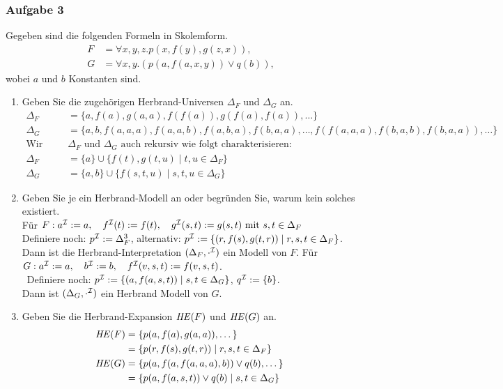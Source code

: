 \subsubsection*{Aufgabe 3}
Gegeben sind die folgenden Formeln in Skolemform. 
\begin{align*}
F &= \forall x,y,z.p(x,f(y),g(z,x)), \\
G &= \forall x,y.(p(a,f(a,x,y)) \lor q(b)),
\end{align*}
wobei $a$ und $b$ Konstanten sind.
\begin{enumerate}
\item Geben Sie die zugehörigen Herbrand-Universen $\Delta_F$ und $\Delta_G$ an. \\
\LOES 
\begin{align*}
\Delta_F &= \{a, f(a), g(a,a), f(f(a)), g(f(a),f(a)), \dots \} \\
\Delta_G &= \{a, b, f(a,a,a), f(a,a,b), f(a,b,a), f(b,a,a), \dots, f(f(a,a,a),f(b,a,b),f(b,a,a)), \dots \} \\
\text{Wir können } &\Delta_F \text{ und } \Delta_G \text{ auch rekursiv wie folgt charakterisieren:} \\
\Delta_F &= \{a\} \cup \{f(t),g(t,u) \mid t,u \in \Delta_F \} \\
\Delta_G &= \{a,b\} \cup \{f(s,t,u) \mid s,t,u \in \Delta_G\}
\end{align*}
\item Geben Sie je ein Herbrand-Modell an oder begründen Sie, warum kein solches existiert. \\
\LOES Für $F: a^{\mathcal{I}} := a,\quad f^{\mathcal{I}}(t) := f(t),\quad g^{\mathcal{I}}(s,t) := g(s,t) \text{ mit } s,t \in \Delta_F$ \\
Definiere noch: $p^{\mathcal{I}} := \Delta_F^3$, alternativ: $p^{\mathcal{I}} := \{(r,f(s),g(t,r)) \mid r,s,t \in \Delta_F \}$. \\
Dann ist die Herbrand-Interpretation $(\Delta_F, \cdot^{\mathcal{I}})$ ein Modell von $F$.
\HRule{3cm}{3mm}
Für $G: a^{\mathcal{I}} := a,\quad b^{\mathcal{I}} := b,\quad f^{\mathcal{I}}(v,s,t) := f(v,s,t)$. \\\
Definiere noch: $p^{\mathcal{I}} := \{(a,f(a,s,t)) \mid s,t \in \Delta_G \}$, $q^{\mathcal{I}} := \{b\}$. \\
Dann ist $(\Delta_G, \cdot^{\mathcal{I}})$ ein Herbrand Modell von $G$.
\item Geben Sie die Herbrand-Expansion $\mathit{HE}(F)$ und $\mathit{HE}(G)$ an. \\
\LOES 
\begin{align*}
\mathit{HE}(F) &= \{p(a,f(a),g(a,a)), \dots \} \\
&= \{p(r,f(s),g(t,r)) \mid r,s,t \in \Delta_F \} \\
\mathit{HE}(G) &= \{ p(a,f(a,f(a,a,a),b)) \lor q(b), \dots \} \\
&= \{ p(a,f(a,s,t)) \lor q(b) \mid s,t \in \Delta_G \}
\end{align*}
\end{enumerate}

